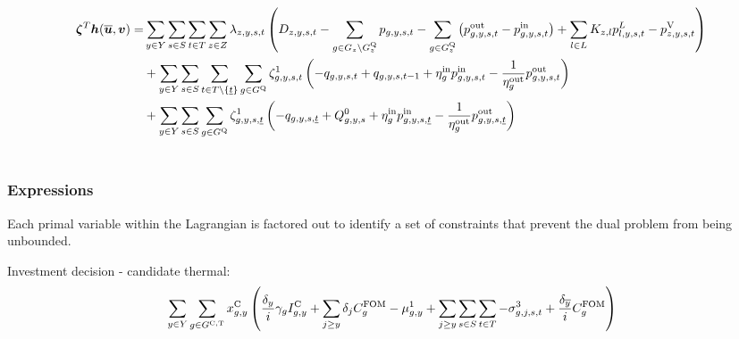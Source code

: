 \documentclass{article}
\begin{document}
\begin{align}
	\bm{\zeta}^{T} \bm{h}(\bm{\overline{u}}, \bm{v}) = 	& \sum\limits_{\iYear \in \sYears}\sum\limits_{\iScenario \in \sScenarios}\sum\limits_{\iInterval \in \sIntervals} \sum\limits_{\iZone \in \sZones} \dPowerBalance \left(\cDemand - \sum\limits_{\iGenerator \in \sGenerators_{\iZone} \setminus \sStorage_{\iZone}} \vPower - \sum\limits_{\iGenerator \in \sStorage_{\iZone}} \left(\vPowerOut - \vPowerIn\right) + \sum\limits_{\iLink \in \sLinks} \cIncidenceMatrix \vPowerFlow - \vLostLoadPower \right) \nonumber\\
	& + \sum\limits_{\iYear \in \sYears}\sum\limits_{\iScenario \in \sScenarios}\sum\limits_{\iInterval \in \sIntervals \setminus \{\iIntervalStart\}} \sum\limits_{\iGenerator \in \sStorage} \dStorageEnergyTransition \left(-\vStorageUnitEnergy + \vStorageUnitEnergy[\iGenerator,\iYear,\iScenario,\iInterval-1] + \cStorageUnitEfficiencyCharging \vPowerIn - \frac{1}{\cStorageUnitEfficiencyDischarging} \vPowerOut \right) \nonumber\\
	& + \sum\limits_{\iYear \in \sYears} \sum\limits_{\iScenario \in \sScenarios} \sum\limits_{\iGenerator \in \sStorage} \dStorageEnergyTransition[\iGenerator,\iYear,\iScenario,\iIntervalStart] \left(-\vStorageUnitEnergy[\iGenerator,\iYear,\iScenario,\iIntervalStart] + \cStorageEnergyInitial + \cStorageUnitEfficiencyCharging \vPowerIn[\iGenerator,\iYear,\iScenario,\iIntervalStart] - \frac{1}{\cStorageUnitEfficiencyDischarging} \vPowerOut[\iGenerator,\iYear,\iScenario,\iIntervalStart] \right)\\\nonumber
\end{align}



\subsubsection{Expressions}
\label{subsubsec: dual expressions}
Each primal variable within the Lagrangian is factored out to identify a set of constraints that prevent the dual problem from being unbounded.

\newcommand{\sumIntervals}{\sum\limits_{\iYear \in \sYears}\sum\limits_{\iScenario \in \sScenarios} \sum\limits_{\iInterval \in \sIntervals}}

Investment decision - candidate thermal:
\begin{align}
	& \sum\limits_{\iYear \in \sYears} \sum\limits_{\iGenerator \in \sGeneratorsCandidateThermal} \vInstalledCapacity \left(\frac{\cDiscountRate}{\cInterestRate} \cAmortisationRate \cCandidateInvestmentCost + \sum\limits_{\iYearAlias \geq \iYear} \cDiscountRate[\iYearAlias] \cFixedOperationsMaintenanceCostGenerator - \dNonNegativeCandidateCapacity + \sum\limits_{\iYearAlias \geq \iYear} \sum\limits_{\iScenario \in \sScenarios} \sum\limits_{\iInterval \in \sIntervals} - \dMaxPowerOutputCandidateThermal[\iGenerator,\iYearAlias,\iScenario,\iInterval] + \frac{\cDiscountRate[\iYearTerminal]}{\cInterestRate}\cFixedOperationsMaintenanceCostGenerator\right)\\\nonumber
\end{align}
\end{document}
